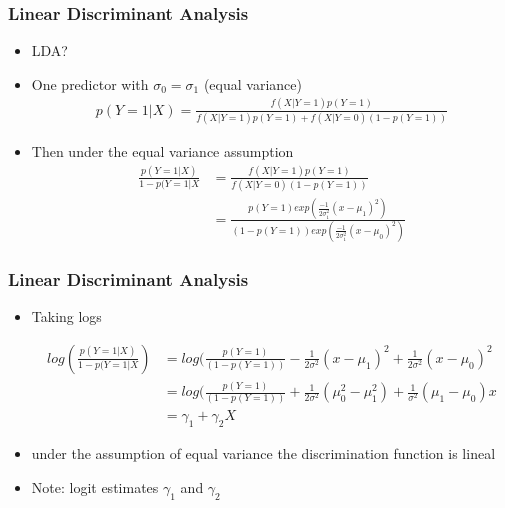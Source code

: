 \documentclass[
  shownotes,
  xcolor={svgnames},
  hyperref={colorlinks,citecolor=DarkBlue,linkcolor=DarkRed,urlcolor=DarkBlue}
  , aspectratio=169]{beamer}
\begin{document}
\begin{frame}[fragile]
\frametitle{Linear Discriminant Analysis}
\begin{itemize}
  \item LDA?
  \item One predictor with $\sigma_0 = \sigma_1$ (equal variance)
  \begin{align}
  p (Y=1|X)=\frac{f(X|Y=1)p(Y=1)}{f(X|Y=1)p(Y=1) + f(X|Y=0)(1-p(Y=1))}
  \end{align}
  \item Then under the equal variance assumption
  \begin{align}
  \frac{p (Y=1|X)}{1-p (Y=1|X} &= \frac{f(X|Y=1)p(Y=1)}{f(X|Y=0)(1-p(Y=1))} \\
                                &= \frac{p(Y=1)exp(\frac{-1}{2\sigma_1^2}(x-\mu_1)^2)}{(1-p(Y=1))exp(\frac{-1}{2\sigma_1^2}(x-\mu_0)^2)} 
  \end{align}
\end{itemize}

\end{frame}
\begin{frame}[fragile]
\frametitle{Linear Discriminant Analysis}
\begin{itemize}
  \item Taking logs

\begin{align}
   log \left( \frac{p (Y=1|X)}{1-p (Y=1|X}\right)  &= log(\frac{p(Y=1)}{(1-p(Y=1))}-\frac{1}{2\sigma^2}(x-\mu_1)^2+\frac{1}{2\sigma^2}(x-\mu_0)^2 \\
  &= log(\frac{p(Y=1)}{(1-p(Y=1))}+\frac{1}{2\sigma^2}\left(\mu^2_0-\mu^2_1\right)+\frac{1}{\sigma^2}(\mu_1-\mu_0)x \\
  &= \gamma_1 +\gamma_2 X
  \end{align}  
  \item under the assumption of equal variance the discrimination function is lineal
  \item Note: logit estimates $\gamma_1$ and $\gamma_2$
\end{itemize}

\end{frame}
\end{document}
